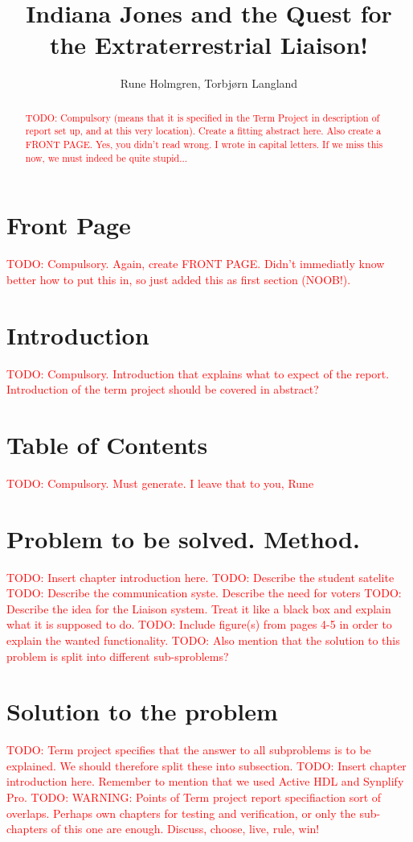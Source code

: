 \documentclass[a4paper]{IEEEtran}
\title{Indiana Jones and the Quest for the Extraterrestrial Liaison!}
\author{
    Rune Holmgren,
    Torbjørn Langland
}
\newcommand\TODO[1]{\textcolor{red}{TODO:#1}}
\newcommand\todo[1]{\TODO{#1}}
\begin{document}
\maketitle

\begin{abstract}
    \todo{ Compulsory (means that it is specified in the Term Project in description of report set up, and at this very location). Create a fitting abstract here. Also create a FRONT PAGE. Yes, you didn't read wrong. I wrote in capital letters. If we miss this now, we must indeed be quite stupid...}
\end{abstract}

\section{Front Page}
\todo{ Compulsory. Again, create FRONT PAGE. Didn't immediatly know better how to put this in, so just added this as first section (NOOB!). }

\section{Introduction}
\todo{ Compulsory. Introduction that explains what to expect of the report. Introduction of the term project should be covered in abstract? }

\section{Table of Contents}
\todo{ Compulsory. Must generate. I leave that to you, Rune}

\section{Problem to be solved. Method.}
\todo{ Insert chapter introduction here. }
\break
\break
\todo{ Describe the student satelite }
\break
\break
\todo{ Describe the communication syste. Describe the need for voters }
\break
\break
\todo{ Describe the idea for the Liaison system. Treat it like a black box and explain what it is supposed to do.}
\break
\break
\todo{ Include figure(s) from pages 4-5 in order to explain the wanted functionality. }
\break
\break
\todo{ Also mention that the solution to this problem is split into different sub-sproblems? }

\section{ Solution to the problem}
\todo{ Term project specifies that the answer to all subproblems is to be explained. We should therefore split these into subsection. }
\break
\break
\todo{ Insert chapter introduction here. Remember to mention that we used Active HDL and Synplify Pro.}
\break
\break
\todo{ WARNING: Points of Term project report specifiaction sort of overlaps. Perhaps own chapters for testing and verification, or only the sub-chapters of this one are enough. Discuss, choose, live, rule, win!} 
\end{document}
